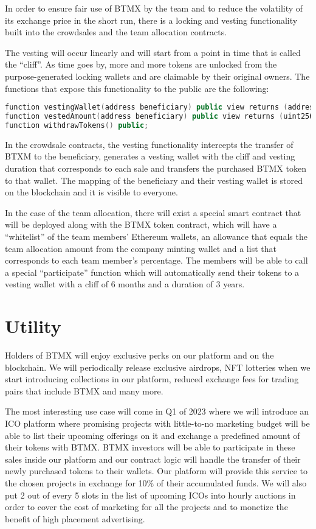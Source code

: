 \documentclass[a4paper,12pt]{article}
\begin{document}
In order to ensure fair use of BTMX by the team and to reduce the volatility of its exchange price in the short run, there is a locking and vesting functionality built into the crowdsales and the team allocation contracts.

The vesting will occur linearly and will start from a point in time that is called the ``cliff''.
As time goes by, more and more tokens are unlocked from the purpose-generated locking wallets and are claimable by their original owners.
The functions that expose this functionality to the public are the following:

\begin{lstlisting}[language=C++, caption=Solidity vesting function signatures.]
function vestingWallet(address beneficiary) public view returns (address);
function vestedAmount(address beneficiary) public view returns (uint256);
function withdrawTokens() public;
\end{lstlisting}

In the crowdsale contracts, the vesting functionality intercepts the transfer of BTXM to the beneficiary, generates a vesting wallet with the cliff and vesting duration that corresponds to each sale and transfers the purchased BTMX token to that wallet.
The mapping of the beneficiary and their vesting wallet is stored on the blockchain and it is visible to everyone.

In the case of the team allocation, there will exist a special smart contract that will be deployed along with the BTMX token contract, which will have a ``whitelist'' of the team members' Ethereum wallets, an allowance that equals the team allocation amount from the company minting wallet and a list that corresponds to each team member's percentage. The members will be able to call a special ``participate'' function which will automatically send their tokens to a vesting wallet with a cliff of 6 months and a duration of 3 years.

\section{Utility}

Holders of BTMX will enjoy exclusive perks on our platform and on the blockchain.
We will periodically release exclusive airdrops, NFT lotteries when we start introducing
collections in our platform, reduced exchange fees for trading pairs that include BTMX
and many more.

The most interesting use case will come in Q1 of 2023 where we will introduce an ICO
platform where promising projects with little-to-no marketing budget will be able to list
their upcoming offerings on it and exchange a predefined amount of their tokens with BTMX.
BTMX investors will be able to participate in these sales inside our platform and our
contract logic will handle the transfer of their newly purchased tokens to their wallets.
Our platform will provide this service to the chosen projects in exchange for 10\% of their
accumulated funds.
We will also put 2 out of every 5 slots in the list of upcoming ICOs into hourly auctions
in order to cover the cost of marketing for all the projects and to monetize the benefit
of high placement advertising.
\end{document}
